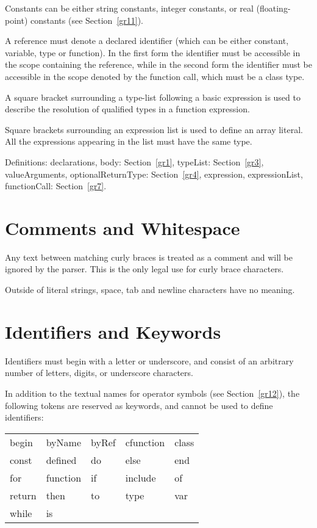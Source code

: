 Constants can be either string constants, integer constants, or
real (floating-point) constants (see Section~\ref{gr11}).

A reference must denote a declared identifier (which can be either
constant, variable, type or function).  In the first
form the identifier must be accessible in the scope containing the reference,
while in the second form the identifier must be accessible in the scope
denoted by the function call, which must be a class type.

A square bracket surrounding a type-list following a basic expression
is used to describe the resolution of qualified types in a function expression.

Square brackets surrounding an expression list is used to define
an array literal.  All the expressions appearing in the list must have
the same type.

Definitions:
declarations, body: Section~\ref{gr1},
typeList: Section~\ref{gr3},
valueArguments, optionalReturnType: Section~\ref{gr4},
expression, expressionList, functionCall: Section~\ref{gr7}.

\section{Comments and Whitespace}\label{gr9}

Any text between matching curly braces is treated as a comment and
will be ignored by the parser.  This is the only legal use for curly
brace characters.

Outside of literal strings, space, tab and newline characters have no
meaning.

\section{Identifiers and Keywords}\label{gr10}

Identifiers must begin with a letter or underscore, and consist of
an arbitrary number of letters, digits, or underscore characters.

In addition to the textual names for operator symbols (see Section~\ref{gr12}),
the following tokens are reserved as keywords, and cannot
be used to define identifiers:

\begin{center}
\begin{tabular}{l l l l l}
begin & byName & byRef & cfunction & class \\
const & defined & do & else & end  \\
for & function & if & include & of \\
return & then & to & type & var \\
while & is \\
\end{tabular}
\end{center}

